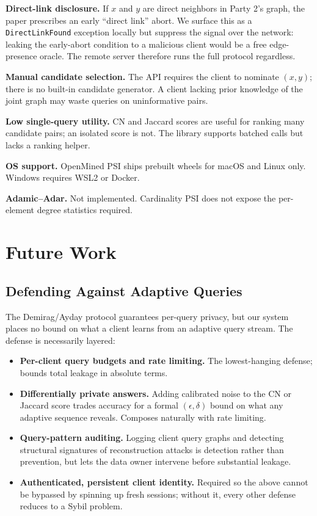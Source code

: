 \documentclass[sigconf]{acmart}
\begin{document}
\textbf{Direct-link disclosure.} If $x$ and $y$ are direct neighbors in Party 2's graph, the paper prescribes an early ``direct link'' abort. We surface this as a \texttt{DirectLinkFound} exception locally but suppress the signal over the network: leaking the early-abort condition to a malicious client would be a free edge-presence oracle. The remote server therefore runs the full protocol regardless.

\textbf{Manual candidate selection.} The API requires the client to nominate $(x,y)$; there is no built-in candidate generator. A client lacking prior knowledge of the joint graph may waste queries on uninformative pairs.

\textbf{Low single-query utility.} CN and Jaccard scores are useful for ranking many candidate pairs; an isolated score is not. The library supports batched calls but lacks a ranking helper.

\textbf{OS support.} OpenMined PSI ships prebuilt wheels for macOS and Linux only. Windows requires WSL2 or Docker.

\textbf{Adamic--Adar.} Not implemented. Cardinality PSI does not expose the per-element degree statistics required.

\section{Future Work}
\label{sec:future}

\subsection{Defending Against Adaptive Queries}
\label{sec:future-adaptive}
The Demirag/Ayday protocol guarantees per-query privacy, but our system places no bound on what a client learns from an adaptive query stream. The defense is necessarily layered:

\begin{itemize}
  \item \textbf{Per-client query budgets and rate limiting.} The lowest-hanging defense; bounds total leakage in absolute terms.
  \item \textbf{Differentially private answers.} Adding calibrated noise to the CN or Jaccard score trades accuracy for a formal $(\epsilon, \delta)$ bound on what any adaptive sequence reveals. Composes naturally with rate limiting.
  \item \textbf{Query-pattern auditing.} Logging client query graphs and detecting structural signatures of reconstruction attacks is detection rather than prevention, but lets the data owner intervene before substantial leakage.
  \item \textbf{Authenticated, persistent client identity.} Required so the above cannot be bypassed by spinning up fresh sessions; without it, every other defense reduces to a Sybil problem.
\end{itemize}
\end{document}
